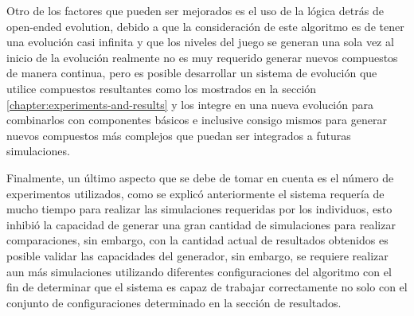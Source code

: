 Otro de los factores que pueden ser mejorados es el uso de la lógica detrás de
open-ended evolution, debido a que la consideración de este algoritmo es de
tener una evolución casi infinita y que los niveles del juego se generan una
sola vez al inicio de la evolución realmente no es muy requerido generar nuevos
compuestos de manera continua, pero es posible desarrollar un sistema de
evolución que utilice compuestos resultantes como los mostrados en la sección
\ref{chapter:experiments-and-results} y los integre en una nueva evolución para
combinarlos con componentes básicos e inclusive consigo mismos para generar
nuevos compuestos más complejos que puedan ser integrados a futuras
simulaciones.

Finalmente, un último aspecto que se debe de tomar en cuenta es el número de
experimentos utilizados, como se explicó anteriormente el sistema requería de
mucho tiempo para realizar las simulaciones requeridas por los individuos, esto
inhibió la capacidad de generar una gran cantidad de simulaciones para realizar
comparaciones, sin embargo, con la cantidad actual de resultados obtenidos es
posible validar las capacidades del generador, sin embargo, se requiere realizar
aun más simulaciones utilizando diferentes configuraciones del algoritmo con el
fin de determinar que el sistema es capaz de trabajar correctamente no solo con
el conjunto de configuraciones determinado en la sección de resultados.
